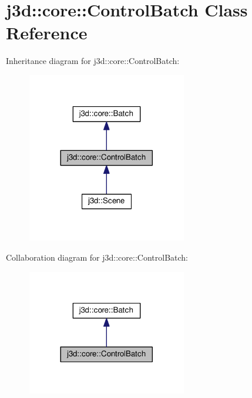 \hypertarget{classj3d_1_1core_1_1ControlBatch}{}\section{j3d\+:\+:core\+:\+:Control\+Batch Class Reference}
\label{classj3d_1_1core_1_1ControlBatch}


Inheritance diagram for j3d\+:\+:core\+:\+:Control\+Batch\+:
\nopagebreak
\begin{figure}[H]
\begin{center}
\leavevmode
\includegraphics[width=197pt]{classj3d_1_1core_1_1ControlBatch__inherit__graph}
\end{center}
\end{figure}


Collaboration diagram for j3d\+:\+:core\+:\+:Control\+Batch\+:
\nopagebreak
\begin{figure}[H]
\begin{center}
\leavevmode
\includegraphics[width=197pt]{classj3d_1_1core_1_1ControlBatch__coll__graph}
\end{center}
\end{figure}
